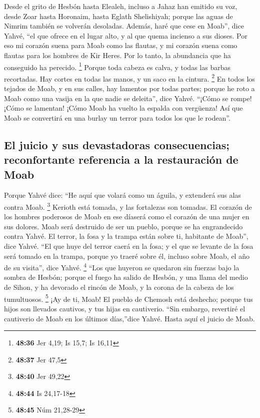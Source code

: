  Desde el grito de Hesbón hasta Elealeh, incluso a Jahaz
han emitido su voz, desde Zoar hasta Horonaim, hasta Eglath Shelishiyah;
porque las aguas de Nimrim también se volverán desoladas.
 Además, haré que cese en Moab'', dice Yahvé, ``el que
ofrece en el lugar alto, y al que quema incienso a sus dioses.
 Por eso mi corazón suena para Moab como las flautas, y
mi corazón suena como flautas para los hombres de Kir Heres. Por lo
tanto, la abundancia que ha conseguido ha perecido. \footnote{\textbf{48:36}
  Jer 4,19; Is 15,7; Is 16,11}  Porque toda cabeza es
calva, y todas las barbas recortadas. Hay cortes en todas las manos, y
un saco en la cintura. \footnote{\textbf{48:37} Jer 47,5}
 En todos los tejados de Moab, y en sus calles, hay
lamentos por todas partes; porque he roto a Moab como una vasija en la
que nadie se deleita'', dice Yahvé.  ``¡Cómo se rompe!
¡Cómo se lamentan! ¡Cómo Moab ha vuelto la espalda con vergüenza! Así
que Moab se convertirá en una burlay un terror para todos los que le
rodean''.

\hypertarget{el-juicio-y-sus-devastadoras-consecuencias-reconfortante-referencia-a-la-restauraciuxf3n-de-moab}{%
\subsection{El juicio y sus devastadoras consecuencias; reconfortante
referencia a la restauración de
Moab}\label{el-juicio-y-sus-devastadoras-consecuencias-reconfortante-referencia-a-la-restauraciuxf3n-de-moab}}

 Porque Yahvé dice: ``He aquí que volará como un águila,
y extenderá sus alas contra Moab. \footnote{\textbf{48:40} Jer 49,22}
 Kerioth está tomada, y las fortalezas son tomadas. El
corazón de los hombres poderosos de Moab en ese díaserá como el corazón
de una mujer en sus dolores.  Moab será destruido de ser
un pueblo, porque se ha engrandecido contra Yahvé.  El
terror, la fosa y la trampa están sobre ti, habitante de Moab'', dice
Yahvé.  ``El que huye del terror caerá en la fosa; y el
que se levante de la fosa será tomado en la trampa, porque yo traeré
sobre él, incluso sobre Moab, el año de su visita'', dice Yahvé.
\footnote{\textbf{48:44} Is 24,17-18}  ``Los que huyeron
se quedaron sin fuerzas bajo la sombra de Hesbón; porque el fuego ha
salido de Hesbón, y una llama del medio de Sihon, y ha devorado el
rincón de Moab, y la corona de la cabeza de los tumultuosos. \footnote{\textbf{48:45}
  Núm 21,28-29}  ¡Ay de ti, Moab! El pueblo de Chemosh
está deshecho; porque tus hijos son llevados cautivos, y tus hijas en
cautiverio.  ``Sin embargo, revertiré el cautiverio de
Moab en los últimos días,''dice Yahvé. Hasta aquí el juicio de Moab.

